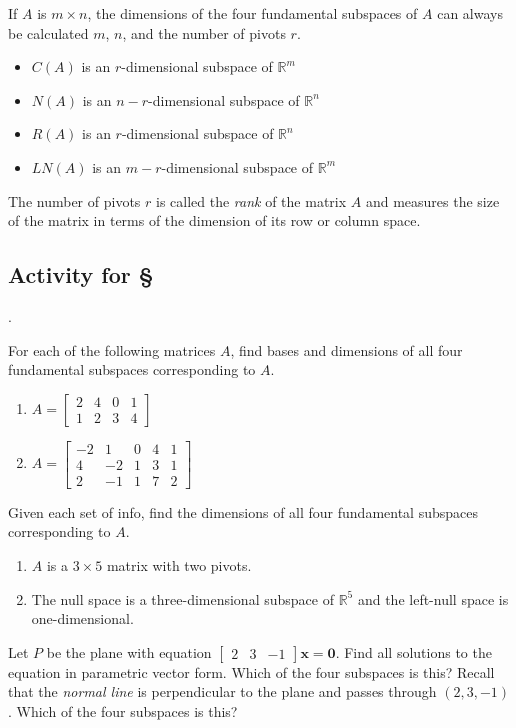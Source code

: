 \documentclass[11pt,oneside]{amsbook}
\newcommand{\R}{\mathbb R}
\theoremstyle{definition}
\theoremstyle{plain}
\theoremstyle{definition}
\theoremstyle{remark}
\numberwithin{equation}{section}
\numberwithin{figure}{section}
\newcounter{activityitem}
\newenvironment{activity}{\begin{list}{\arabic{activityitem}.}{\usecounter{activityitem}\setlength{\itemsep}{.2in}}}{\end{list}}
\begin{document}
If $A$ is $m\times n$, the dimensions of the four fundamental subspaces of $A$ can always be calculated $m$, $n$, and the number of pivots $r$.
\begin{itemize}
  \item $C(A)$ is an $r$-dimensional subspace of $\R^m$
  \item $N(A)$ is an $n-r$-dimensional subspace of $\R^n$
  \item $R(A)$ is an $r$-dimensional subspace of $\R^n$
  \item $LN(A)$ is an $m-r$-dimensional subspace of $\R^m$
\end{itemize}
The number of pivots $r$ is called the \emph{rank} of the matrix $A$ and measures the size of the matrix in terms of the dimension of its row or column space.

\newpage
\subsection*{Activity for \S \thesection}

\begin{activity}
  \item For each of the following matrices $A$, find bases and dimensions of all four fundamental subspaces corresponding to $A$.
  \begin{enumerate}
    \item $A=\begin{bmatrix}
      2&4&0&1\\1&2&3&4
    \end{bmatrix}$
    \item $A=\begin{bmatrix}
      -2&1&0&4&1\\4&-2&1&3&1\\2&-1&1&7&2
    \end{bmatrix}$
  \end{enumerate}
  \item Given each set of info, find the dimensions of all four fundamental subspaces corresponding to $A$.
  \begin{enumerate}
    \item $A$ is a $3\times 5$ matrix with two pivots.
    \item The null space is a three-dimensional subspace of $\R^5$ and the left-null space is one-dimensional.
  \end{enumerate}
  \item Let $P$ be the plane with equation $\begin{bmatrix}2&3&-1\end{bmatrix}\mathbf{x}=\mathbf{0}$. Find all solutions to the equation in parametric vector form. Which of the four subspaces is this? Recall that the \emph{normal line} is perpendicular to the plane and passes through $(2,3,-1)$. Which of the four subspaces is this?
\end{activity}
\end{document}
